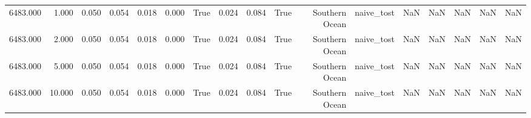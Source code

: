 \begin{table}
{\begin{tabular}{lrrrrrrrrrrrrrrrr}
6483.000 & 1.000 & 0.050 & 0.054 & 0.018 & 0.000 & True & 0.024 & 0.084 & True & Southern Ocean & naive\_tost & NaN & NaN & NaN & NaN & NaN \\
6483.000 & 2.000 & 0.050 & 0.054 & 0.018 & 0.000 & True & 0.024 & 0.084 & True & Southern Ocean & naive\_tost & NaN & NaN & NaN & NaN & NaN \\
6483.000 & 5.000 & 0.050 & 0.054 & 0.018 & 0.000 & True & 0.024 & 0.084 & True & Southern Ocean & naive\_tost & NaN & NaN & NaN & NaN & NaN \\
6483.000 & 10.000 & 0.050 & 0.054 & 0.018 & 0.000 & True & 0.024 & 0.084 & True & Southern Ocean & naive\_tost & NaN & NaN & NaN & NaN & NaN \\
\bottomrule
\end{tabular}%
}
\end{table}
